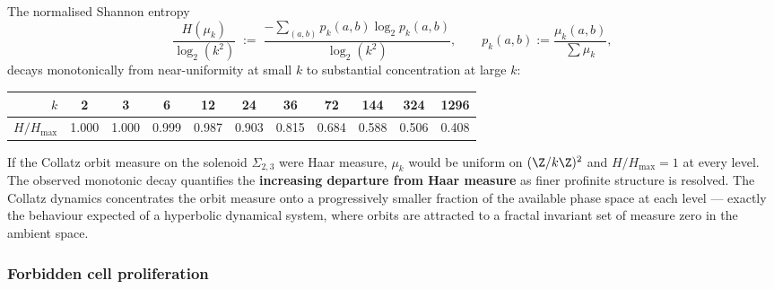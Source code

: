 \begin{empirical}
\label{obs:entropy}
    The normalised Shannon entropy
    \begin{equation}
        \frac{H(\mu_k)}{\log_2(k^2)} \;:=\;
        \frac{-\sum_{(a,b)} p_k(a,b) \log_2 p_k(a,b)}{\log_2(k^2)},
        \qquad p_k(a,b) := \frac{\mu_k(a,b)}{\sum \mu_k},
    \end{equation}
    decays monotonically from near-uniformity at small $k$ to
    substantial concentration at large $k$:
    \begin{center}
    \renewcommand{\arraystretch}{1.15}
    \begin{tabular}{rcccccccccc}
        \toprule
        $k$ & 2 & 3 & 6 & 12 & 24 & 36 & 72 & 144 & 324 & 1296 \\
        \midrule
        $H/H_{\max}$ & 1.000 & 1.000 & 0.999 & 0.987 & 0.903
                      & 0.815 & 0.684 & 0.588 & 0.506 & 0.408 \\
        \bottomrule
    \end{tabular}
    \end{center}
\end{empirical}

\begin{keyinsight}
    If the Collatz orbit measure on the solenoid $\Sigma_{2,3}$ were
    Haar measure, $\mu_k$ would be uniform on $(\Z/k\Z)^2$ and
    $H/H_{\max} = 1$ at every level.  The observed monotonic decay
    quantifies the \textbf{increasing departure from Haar measure}
    as finer profinite structure is resolved.  The Collatz dynamics
    concentrates the orbit measure onto a progressively smaller
    fraction of the available phase space at each level --- exactly the
    behaviour expected of a hyperbolic dynamical system, where orbits
    are attracted to a fractal invariant set of measure zero in the
    ambient space.
\end{keyinsight}


\subsubsection{Forbidden cell proliferation}

